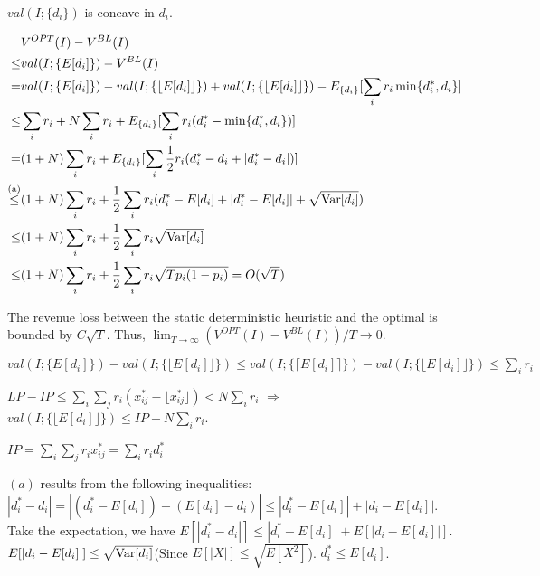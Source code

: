 $val(I; \{d_{i}\})$ is concave in $d_{i}$.

\begin{align*}
   & V^{OPT}(I) - V^{BL}(I) \\
\leq & val(I; \{E[d_{i}]\}) - V^{BL}(I) \\
= & val(I; \{E[d_{i}]\}) - val(I; \{\lfloor E[d_{i}]\rfloor\}) + val(I; \{\lfloor E[d_{i}]\rfloor\}) - E_{\{d_{i}\}}[\sum_{i} r_{i} \min\{d_{i}^{*}, d_{i}\}] \\
\leq & \sum_{i} r_{i} + N \sum_{i} r_i + E_{\{d_{i}\}}[\sum_{i} r_{i} (d_{i}^{*} - \min\{d_{i}^{*}, d_{i}\})] \\
= & (1+N) \sum_{i} r_{i} + E_{\{d_{i}\}}[\sum_{i} \frac{1}{2} r_{i} (d_{i}^{*} - d_{i} + |d_{i}^{*} - d_{i}|)] \\
\overset{\text{(a)}}{\leq} & (1+N) \sum_{i} r_{i} + \frac{1}{2} \sum_{i} r_{i} (d_{i}^{*} - E[d_{i}] + |d_{i}^{*} - E[d_{i}]| + \sqrt{\operatorname{{Var}}[d_{i}]}) \\
\leq & (1+N) \sum_{i} r_{i} + \frac{1}{2} \sum_{i} r_{i} \sqrt{\operatorname{{Var}}[d_{i}]} \\
\leq & (1+N) \sum_{i} r_{i} + \frac{1}{2} \sum_{i} r_{i} \sqrt{T p_{i} (1- p_{i})} = O(\sqrt{T})
\end{align*}

The revenue loss between the static deterministic heuristic and the optimal is bounded by $C \sqrt{T}$.
Thus, $\lim_{T \to \infty} (V^{OPT}(I) - V^{BL}(I))/T \to 0$.

$val(I; \{E[d_{i}]\}) - val(I; \{\lfloor E[d_{i}]\rfloor\}) \leq val(I; \{\lceil E[d_{i}]\rceil\}) - val(I; \{\lfloor E[d_{i}]\rfloor\}) \leq \sum_{i} r_{i}$


$LP -IP \leq \sum_{i} \sum_{j} r_{i} (x_{ij}^{*} - \lfloor x_{ij}^{*} \rfloor) < N \sum_{i} r_i$ $\Rightarrow$ $val(I; \{\lfloor E[d_{i}]\rfloor\}) \leq IP + N \sum_{i} r_i$.

$IP = \sum_{i} \sum_{j} r_{i} x_{ij}^{*} = \sum_{i} r_{i} d_{i}^{*}$

$(a)$ results from the following inequalities: $|d_{i}^{*} -d_{i}| = |(d_{i}^{*}-E[d_{i}]) + (E[d_{i}] -d_{i})| \leq |d_{i}^{*}-E[d_{i}]| + |d_{i} - E[d_{i}]|$. Take the expectation, we have $E[|d_{i}^{*} -d_{i}|]\leq |d_{i}^{*}-E[d_{i}]| + E[|d_{i} - E[d_{i}]|]$. $E[|d_{i} - E[d_{i}]|] \leq \sqrt{\operatorname{{Var}}[d_{i}]}$(Since $E[|X|] \leq \sqrt{E[X^{2}]}$). $d_{i}^{*} \leq E[d_{i}]$.



